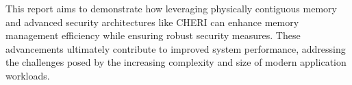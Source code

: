 This report aims to demonstrate how leveraging physically contiguous memory and advanced security architectures like CHERI can 
enhance memory management efficiency while ensuring robust security measures. These advancements ultimately contribute to 
improved system performance, addressing the challenges posed by the increasing complexity and size of modern application workloads.